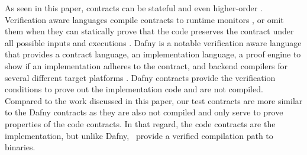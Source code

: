 As seen in this paper, contracts can be stateful and even
higher-order \cite{10.1145/583852.581484}.  Verification aware
languages compile contracts to runtime
monitors \cite{10.1007/978-3-642-28869-2_11}, or omit them when they
can statically prove that the code preserves the contract under all
possible inputs and executions \cite{10.1145/3158139}. Dafny is a
notable verification aware language that provides a contract language,
an implementation language, a proof engine to show if an
implementation adheres to the contract, and backend compilers for
several different target platforms \cite{dafny}.  Dafny contracts
provide the verification conditions to prove out the implementation
code and are not compiled.  Compared to the work discussed in this
paper, our test contracts are more similar to the Dafny contracts as
they are also not compiled and only serve to prove properties of the
code contracts.  In that regard, the code contracts are the
implementation, but unlike Dafny, \ckml\ provide a verified
compilation path to binaries.
